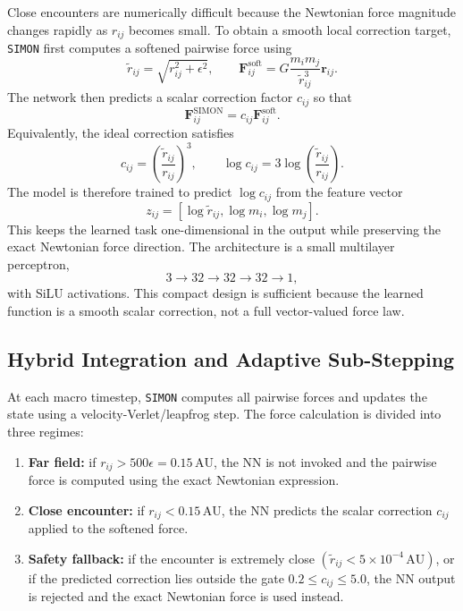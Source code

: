 \documentclass[12pt]{article}
\begin{document}
Close encounters are numerically difficult because the Newtonian force magnitude changes
rapidly as $r_{ij}$ becomes small. To obtain a smooth local correction target, \texttt{SIMON}
first computes a softened pairwise force using
\[
\tilde r_{ij}=\sqrt{r_{ij}^2+\epsilon^2},
\qquad
\mathbf{F}_{ij}^{\mathrm{soft}}
=
G\frac{m_i m_j}{\tilde r_{ij}^{3}}\mathbf{r}_{ij}.
\]
The network then predicts a scalar correction factor $c_{ij}$ so that
\[
\mathbf{F}_{ij}^{\mathrm{SIMON}}
=
c_{ij}\mathbf{F}_{ij}^{\mathrm{soft}}.
\]
Equivalently, the ideal correction satisfies
\[
c_{ij}
=
\left(\frac{\tilde r_{ij}}{r_{ij}}\right)^3,
\qquad
\log c_{ij}
=
3\log\left(\frac{\tilde r_{ij}}{r_{ij}}\right).
\]
The model is therefore trained to predict $\log c_{ij}$ from the feature vector
\[
z_{ij}=[\log \tilde r_{ij}, \log m_i, \log m_j].
\]
This keeps the learned task one-dimensional in the output while preserving the exact
Newtonian force direction. The architecture is a small multilayer perceptron,
\[
3 \rightarrow 32 \rightarrow 32 \rightarrow 32 \rightarrow 1,
\]
with SiLU activations. This compact design is sufficient because the learned function is a
smooth scalar correction, not a full vector-valued force law.

\subsection{Hybrid Integration and Adaptive Sub-Stepping}
\label{sec:adaptive}

At each macro timestep, \texttt{SIMON} computes all pairwise forces and updates the state
using a velocity-Verlet/leapfrog step. The force calculation is divided into three regimes:

\begin{enumerate}
    \item \textbf{Far field:} if $r_{ij}>500\epsilon=0.15\,\mathrm{AU}$, the NN is not invoked and
    the pairwise force is computed using the exact Newtonian expression.
    \item \textbf{Close encounter:} if $r_{ij}<0.15\,\mathrm{AU}$, the NN predicts the scalar
    correction $c_{ij}$ applied to the softened force.
    \item \textbf{Safety fallback:} if the encounter is extremely close
    $(\tilde r_{ij}<5\times10^{-4}\,\mathrm{AU})$, or if the predicted correction lies outside
    the gate $0.2\leq c_{ij}\leq 5.0$, the NN output is rejected and the exact Newtonian
    force is used instead.
\end{enumerate}
\end{document}
